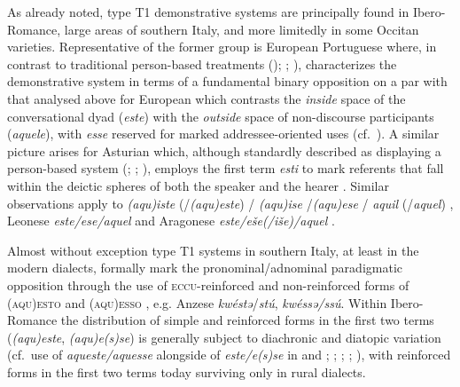 \documentclass[output=paper]{langsci/langscibook}
\begin{document}
As already noted, type T1 demonstrative systems are principally found in
Ibero-Romance, large areas of southern Italy, and more limitedly in some
Occitan varieties. Representative of the former group is European Portuguese
where, in contrast to traditional person-based treatments
(\citealt{Cunha:1984a}); \citealt[166]{Tlaskal:1994a};
\citealt{Topa-Valentim:2015a}), \textcites[93--95]{Jungbluth:2000a}%
[31]{Jungbluth:2003a}[§3.2.3.2]{Jungbluth:2017a} characterizes
the demonstrative system in terms of a fundamental binary opposition on a par
with that analysed above for European  which contrasts the \emph{inside}
space of the conversational dyad (\emph{este}) with the \emph{outside} space of
non-discourse participants (\emph{aquele}), with \emph{esse} reserved for
marked addressee-oriented uses (cf.\ \citealt[247--251]{Carvalho:1976a}). A
similar picture arises for Asturian which, although standardly described as
displaying a person-based system (\citealt[166]{Garcia-de-Diego:1946a};
\citealt[8]{Frias-Conde:1999a}; \citealt[103]{ALIA:2001a}), employs the first
term \emph{esti} to mark referents that fall within the deictic spheres of both
the speaker and the hearer \citep[105]{ALIA:2001a}. Similar observations apply
to  \emph{(aqu)iste} (/\emph{(aqu)este}) / \emph{(aqu)ise}
/\emph{(aqu)ese} / \emph{aquil} (/\emph{aquel})
\citep[94]{Garcia-de-Diego:1946a}, Leonese \emph{este/ese/aquel}
\citep[176]{Zamora-Vicente:1967a} and Aragonese \emph{este/eše(/iše)/aquel}
\citep[260]{Garcia-de-Diego:1946a}.

Almost without exception type T1 systems in southern Italy, at least in the
modern dialects, formally mark the pronominal/adnominal paradigmatic opposition
through the use of \textsc{eccu}{}-reinforced and non-reinforced forms of
\textsc{(aqu)esto} and \textsc{(aqu)esso} \citep[71--74]{ledgeway2004sviluppo},
e.g. Anzese \emph{kwéstə}/\emph{stú}, \emph{kwéssə/ssú}. With\-in Ibero-Romance
the distribution of simple and reinforced forms in the first two terms
(\emph{(aqu)este}, \emph{(aqu)e(s)se}) is generally subject to diachronic and
diatopic variation (cf.\ use of \emph{aqueste/aquesse} alongside of
\emph{este/e(s)se} in  and ; \citealt[5]{Kjellman:1928a};
\citealt[39]{Teyssier:1980a}; \citealt[211]{Penny:2000a};
\citealt[§2.2.1.1]{Sornicola:2011a}), with reinforced forms in
the first two terms today surviving only in rural dialects.
\end{document}
